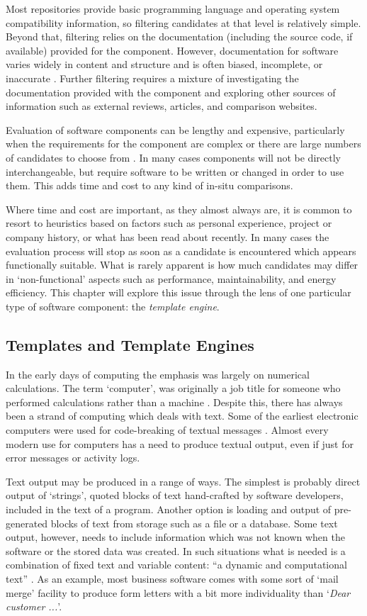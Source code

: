 Most repositories provide basic programming language and operating system compatibility information, so filtering candidates at that level is relatively simple. Beyond that, filtering relies on the documentation (including the source code, if available) provided for the component. However, documentation for software varies widely in content and structure and is often biased, incomplete, or inaccurate \citep{Bertoa2003}. Further filtering requires a mixture of investigating the documentation provided with the component and exploring other sources of information such as external reviews, articles, and comparison websites.

Evaluation of software components can be lengthy and expensive, particularly when the requirements for the component are complex or there are large numbers of candidates to choose from \citep{Badampudi2016}. In many cases components will not be directly interchangeable, but require software to be written or changed in order to use them. This adds time and cost to any kind of in-situ comparisons.

Where time and cost are important, as they almost always are, it is common to resort to heuristics based on factors such as personal experience, project or company history, or what has been read about recently. In many cases the evaluation process will stop as soon as a candidate is encountered which appears functionally suitable. What is rarely apparent is how much candidates may differ in `non-functional' aspects such as performance, maintainability, and energy efficiency. This chapter will explore this issue through the lens of one particular type of software component: the \emph{template engine}.

\subsection{Templates and Template Engines}

In the early days of computing the emphasis was largely on numerical calculations. The term `computer', was originally a job title for someone who performed calculations rather than a machine \citep{NASA2016}. Despite this, there has always been a strand of computing which deals with text. Some of the earliest electronic computers were used for code-breaking of textual messages \citep{Copeland2004}.  Almost every modern use for computers has a need to produce textual output, even if just for error messages or activity logs. 

Text output may be produced in a range of ways. The simplest is probably direct output of `strings', quoted blocks of text hand-crafted by software developers, included in the text of a program. Another option is loading and output of pre-generated blocks of text from storage such as a file or a database. Some text output, however, needs to include information which was not known when the software or the stored data was created. In such situations what is needed is a combination of fixed text and variable content: \enquote{a dynamic and computational text} \citep{Rodgers1999}. As an example, most business software comes with some sort of `mail merge' facility to produce form letters with a bit more individuality than `\emph{Dear customer ...}'.

